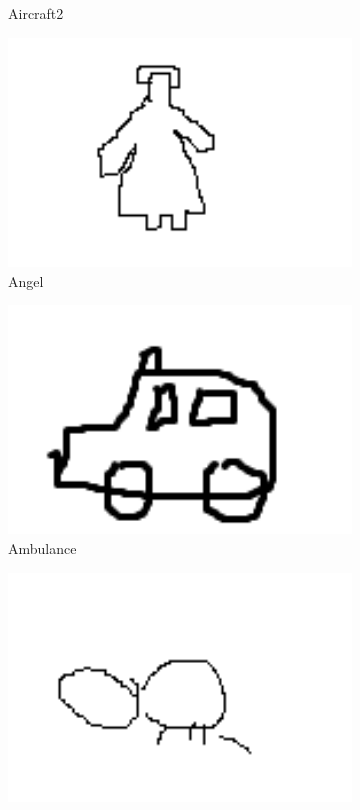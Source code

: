 \documentclass{article}
\begin{document}
\begin{figure}[H]
\begin{subfigure}{.25\textwidth}
        \caption{Aircraft2}
        \label{fig:Aircraft2}
    \end{subfigure}
    \begin{subfigure}{.25\textwidth}
        \centering
        \includegraphics[width=1\textwidth]{./img/4.png}
        \caption{Angel}
        \label{fig:Angel}
    \end{subfigure}
    \begin{subfigure}{.25\textwidth}
        \centering
        \includegraphics[width=1\textwidth]{./img/5.png}
        \caption{Ambulance}
        \label{fig:Ambulance}
    \end{subfigure}
    \begin{subfigure}{.25\textwidth}
        \centering
        \includegraphics[width=1\textwidth]{./img/6.png}

\end{subfigure}
\end{figure}
\end{document}
